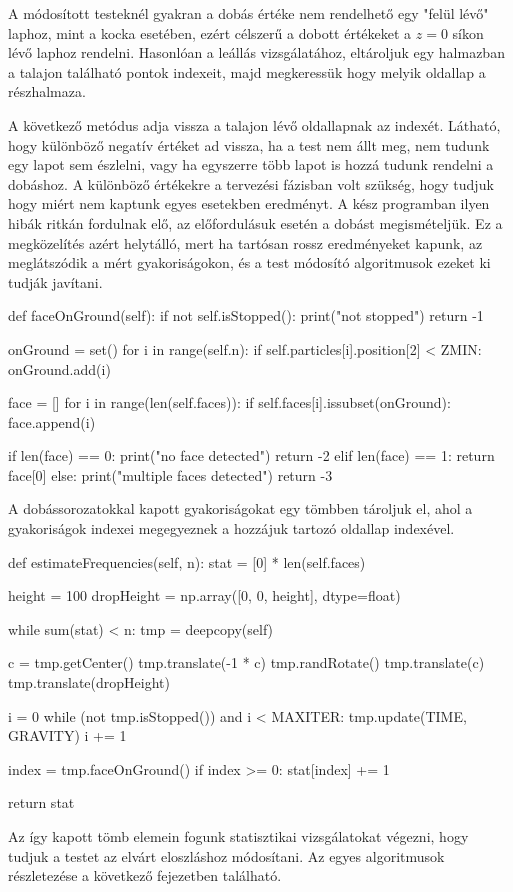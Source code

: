 \newpage


A módosított testeknél gyakran a dobás értéke nem rendelhető egy "felül lévő" laphoz, mint a kocka esetében, ezért célszerű a dobott értékeket a $z=0$ síkon lévő laphoz rendelni.
Hasonlóan a leállás vizsgálatához, eltároljuk egy halmazban a talajon található pontok indexeit, majd megkeressük hogy melyik oldallap a részhalmaza.

A következő metódus adja vissza a talajon lévő oldallapnak az indexét.
Látható, hogy különböző negatív értéket ad vissza, ha a test nem állt meg, nem tudunk egy lapot sem észlelni, vagy ha egyszerre több lapot is hozzá tudunk rendelni a dobáshoz.
A különböző értékekre a tervezési fázisban volt szükség, hogy tudjuk hogy miért nem kaptunk egyes esetekben eredményt.
A kész programban ilyen hibák ritkán fordulnak elő, az előfordulásuk esetén a dobást megismételjük.
Ez a megközelítés azért helytálló, mert ha tartósan rossz eredményeket kapunk, az meglátszódik a mért gyakoriságokon, és a test módosító algoritmusok ezeket ki tudják javítani.

\begin{python}
def faceOnGround(self):
    if not self.isStopped():
        print("not stopped")
        return -1

    onGround = set()
    for i in range(self.n):
        if self.particles[i].position[2] < ZMIN:
            onGround.add(i)

    face = []
    for i in range(len(self.faces)):
        if self.faces[i].issubset(onGround):
            face.append(i)

    if len(face) == 0:
        print("no face detected")
        return -2
    elif len(face) == 1:
        return face[0]
    else:
        print("multiple faces detected")
        return -3
\end{python}

\newpage

A dobássorozatokkal kapott gyakoriságokat egy tömbben tároljuk el, ahol a gyakoriságok indexei megegyeznek a hozzájuk tartozó oldallap indexével.

\begin{python}
def estimateFrequencies(self, n):
    stat = [0] * len(self.faces)

    height = 100
    dropHeight = np.array([0, 0, height], dtype=float)

    while sum(stat) < n:
        tmp = deepcopy(self)

        c = tmp.getCenter()
        tmp.translate(-1 * c)
        tmp.randRotate()
        tmp.translate(c)
        tmp.translate(dropHeight)

        i = 0
        while (not tmp.isStopped()) and i < MAXITER:
            tmp.update(TIME, GRAVITY)
            i += 1

        index = tmp.faceOnGround()
        if index >= 0:
            stat[index] += 1

    return stat
\end{python}

Az így kapott tömb elemein fogunk statisztikai vizsgálatokat végezni, hogy tudjuk a testet az elvárt eloszláshoz módosítani.
Az egyes algoritmusok részletezése a következő fejezetben található.
